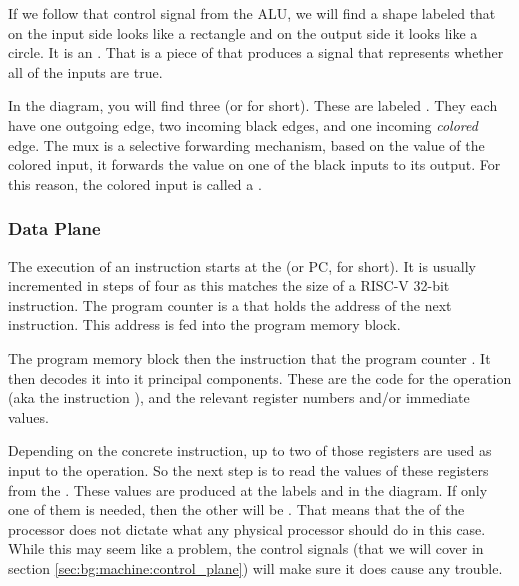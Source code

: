 If we follow that control signal from the ALU, we will find a shape labeled  that on the input side looks like a rectangle and on the output side it looks like a circle. It is an . That is a piece of  that produces a signal that represents whether all of the inputs are true.

In the diagram, you will find three  (or  for short). These are labeled . They each have one outgoing edge, two incoming black edges, and one incoming \textsl{colored} edge. The mux is a selective forwarding mechanism, based on the value of the colored input, it forwards the value on one of the black inputs to its output. For this reason, the colored input is called a .

\subsubsection{Data Plane}

The execution of an instruction starts at the  (or PC, for short). It is usually incremented in steps of four as this matches the size of a RISC-V 32-bit instruction. The program counter is a  that holds the address of the next instruction. This address is fed into the program memory block.

The program memory block then  the instruction that the program counter . It then decodes it into it principal components. These are the code for the operation (aka the instruction ), and the relevant register numbers and/or immediate values.

Depending on the concrete instruction, up to two of those registers are used as input to the operation. So the next step is to read the values of these registers from the . These values are produced at the labels  and  in the diagram. If only one of them is needed, then the other will be . That means that the  of the processor does not dictate what any physical processor should do in this case. While this may seem like a problem, the control signals (that we will cover in section \ref{sec:bg:machine:control_plane}) will make sure it does cause any trouble.

